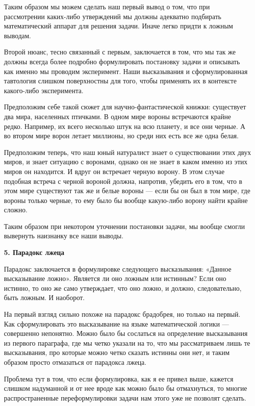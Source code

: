 Таким образом мы можем сделать наш первый вывод о том, что при рассмотрении каких-либо утверждений мы должны адекватно подбирать математический аппарат для решения задачи. Иначе легко придти к ложным выводам.

Второй нюанс, тесно связанный с первым, заключается в том, что мы так же должны всегда более подробно формулировать постановку задачи и описывать как именно мы проводим эксперимент. Наши высказывания и сформулированная тавтология слишком поверхностны для того, чтобы применять их в контексте какого-либо эксперимента.

Предположим себе такой сюжет для научно-фантастической книжки: существует два мира, населенных птичками. В одном мире вороны встречаются крайне редко. Например, их всего несколько штук на всю планету, и все они черные. А во втором мире ворон летает миллионы, но среди них есть все же одна белая.

Предположим теперь, что наш юный натуралист знает о существовании этих двух миров, и знает ситуацию с воронами, однако он не знает в каком именно из этих миров он находится. И вдруг он встречает черную ворону. В этом случае подобная встреча с черной вороной должна, напротив, убедить его в том, что в этом мире существуют так же и белые вороны — если бы он был в том мире, где вороны только черные, то ему было бы вообще какую-либо ворону найти крайне сложно.

Таким образом при некотором уточнении постановки задачи, мы вообще смогли вывернуть наизнанку все наши выводы.

{\bfseries 5. Парадокс лжеца}

Парадокс заключается в формулировке следующего высказывания: «Данное высказывание ложно». Является ли оно ложным или истинным? Если оно истинно, то оно же само утверждает, что оно ложно, и должно, следовательно, быть ложным. И наоборот.

На первый взгляд сильно похоже на парадокс брадобрея, но только на первый.  Как сформулировать это высказывание на языке математической логики — совершенно непонятно. Можно было бы сослаться на определение высказывания из первого параграфа, где мы четко указали на то, что мы рассматриваем лишь те высказывания, про которые можно четко сказать истинны они нет, и таким образом просто отмазаться от парадокса лжеца.

Проблема тут в том, что если формулировка, как я ее привел выше, кажется слишком надуманной и от нее вроде как можно было бы отмахнуться, то многие распространенные переформулировки задачи нам этого уже не позволят сделать.


